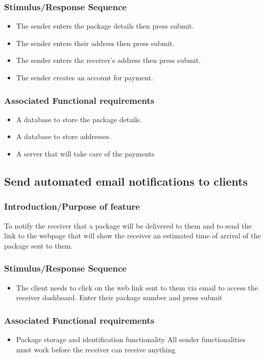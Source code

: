 \documentclass[paper=a4, fontsize=11pt]{scrartcl} %
\numberwithin{equation}{section} %
\numberwithin{figure}{section} %
\numberwithin{table}{section} %
\begin{document}
\subsubsection{Stimulus/Response Sequence}
\begin{itemize}
\item The sender enters the package details then press submit.
\item The sender enters their address then press submit.
\item The sender enters the receiver's address then press submit.
\item The sender creates an account for payment.
\end{itemize}
\subsubsection{Associated Functional requirements}
\begin{itemize}
\item A database to store the package details.
\item A database to store addresses.
\item A server that will take care of the payments
\end{itemize}


\subsection{Send automated email notifications to clients}
\subsubsection{Introduction/Purpose of feature}

To notify the receiver that a package will be delivered to them and to send the link to the webpage that will show the receiver an estimated time of arrival of the package sent to them.

\subsubsection{Stimulus/Response Sequence}
\begin{itemize}
\item The client needs to click on the web link sent to them via email to access the receiver dashboard.
Enter their package number and press submit
\end{itemize}
\subsubsection{Associated Functional requirements}
\begin{itemize}
\item Package storage and identification functionality
All sender functionalities must work before the receiver can receive anything
\end{itemize}
\end{document}
